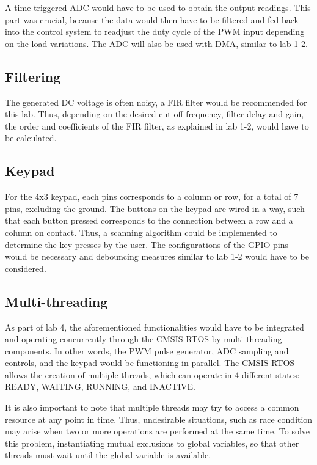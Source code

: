\documentclass[a4paper,titlepage]{article}
\begin{document}
A time triggered ADC would have to be used to obtain the output readings. This part was crucial, because the data would then have to be filtered and fed back into the control system to readjust the duty cycle of the PWM input depending on the load variations. The ADC will also be used with DMA, similar to lab 1-2.
\subsection{Filtering}
The generated DC voltage is often noisy, a FIR filter would be recommended for this lab. Thus, depending on the desired cut-off frequency, filter delay and gain, the order and coefficients of the FIR filter, as explained in lab 1-2, would have to be calculated.
\subsection{Keypad}
For the 4x3 keypad, each pins corresponds to a column or row, for a total of 7 pins, excluding the ground. The buttons on the keypad are wired in a way, such that each button pressed corresponds to the connection between a row and a column on contact. Thus, a scanning algorithm could be implemented to determine the key presses by the user. The configurations of the GPIO pins would be necessary and debouncing measures similar to lab 1-2 would have to be considered.

\subsection{Multi-threading}
As part of lab 4, the aforementioned functionalities would have to be integrated and operating concurrently through the CMSIS-RTOS  by multi-threading components. In other words, the PWM pulse generator, ADC sampling and controls, and the keypad would be functioning in parallel.
The CMSIS RTOS allows the creation of multiple threads, which can operate in 4 different states: READY, WAITING, RUNNING, and INACTIVE.

It is also important to note that multiple threads may try to access a common resource at any point in time. Thus, undesirable situations, such as race condition may arise when two or more operations are performed at the same time. To solve this problem, instantiating mutual exclusions to global variables, so that other threads must wait until the global variable is available.
\end{document}
